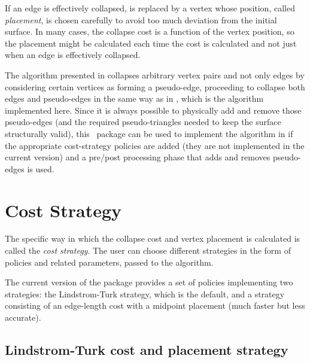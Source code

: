 If an edge is effectively collapsed, is replaced by a vertex whose position, called 
{\em placement}, is chosen carefully to avoid too much deviation from the initial 
surface. In many cases, the collapse cost is a function of the vertex position, so the 
placement might be calculated each time the cost is calculated and not just when an 
edge is effectively collapsed.

The algorithm presented in \cite{gh-ssqem-97} collapses arbitrary vertex pairs and not 
only edges by considering certain vertices as forming a pseudo-edge, proceeding to collapse
both edges and pseudo-edges in the same way as in \cite{cgal:lt-fmeps-98,cgal:lt-ems-99}, 
which is the algorithm implemented here. Since it is always possible to physically add and 
remove those pseudo-edges (and the required pseudo-triangles needed to keep the surface 
structurally valid), this \cgal\ package can be used to implement the algorithm
in \cite{gh-ssqem-97} if the appropriate cost-strategy policies are added 
(they are not implemented in the current version) and a pre/post processing phase that
adds and removes pseudo-edges is used.

\section{Cost Strategy}

The specific way in which the collapse cost and vertex placement is
calculated is called the {\em cost strategy}. The user can choose 
different strategies in the form of policies and related parameters,
passed to the algorithm.
 
The current version of the package provides a set of policies implementing
two strategies: the Lindstrom-Turk strategy, which is the default, and 
a strategy consisting of an edge-length cost with a midpoint placement 
(much faster but less accurate).

\subsection{Lindstrom-Turk cost and placement strategy\label{SurfaceMeshSimplification:LindstromTurkStrategy}}

